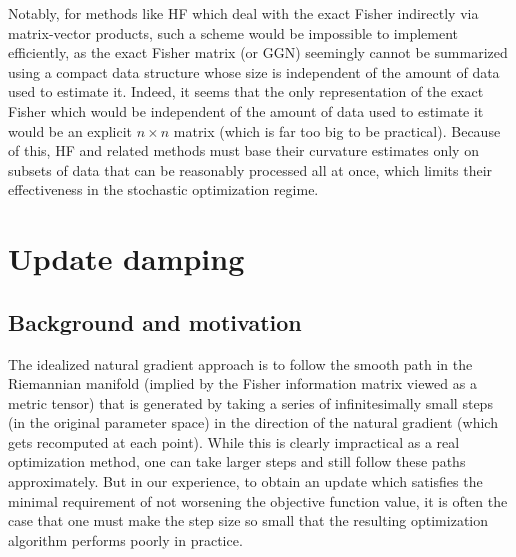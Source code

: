 \documentclass[12pt]{article}
\begin{document}
Notably, for methods like HF which deal with the exact Fisher indirectly via matrix-vector products, such a scheme would be impossible to implement efficiently, as the exact Fisher matrix (or GGN) seemingly cannot be summarized using a compact data structure whose size is independent of the amount of data used to estimate it.  Indeed, it seems that the only representation of the exact Fisher which would be independent of the amount of data used to estimate it would be an explicit $n \times n$ matrix (which is far too big to be practical).  Because of this, HF and related methods must base their curvature estimates only on subsets of data that can be reasonably processed all at once, which limits their effectiveness in the stochastic optimization regime. %



\section{Update damping}
\label{sec:damping}

\subsection{Background and motivation}


The idealized natural gradient approach is to follow the smooth path in the Riemannian manifold (implied by the Fisher information matrix viewed as a metric tensor) that is generated by taking a series of infinitesimally small steps (in the original parameter space) in the direction of the natural gradient (which gets recomputed at each point). While this is clearly impractical as a real optimization method, one can take larger steps and still follow these paths approximately.  But in our experience, to obtain an update which satisfies the minimal requirement of not worsening the objective function value, it is often the case that one must make the step size so small that the resulting optimization algorithm performs poorly in practice.
\end{document}

